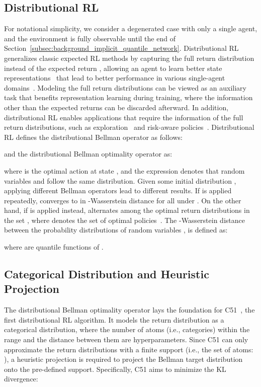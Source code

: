 \documentclass[twoside,11pt]{article}
\begin{document}
\subsection{Distributional RL}
\label{subsec:background_distributional_rl}

For notational simplicity, we consider a degenerated case with only a single agent, and the environment is fully observable until the end of Section~\ref{subsec:background_implicit_quantile_network}. Distributional RL generalizes classic expected RL methods by capturing the full return distribution  instead of the expected return , allowing an agent to learn better state representations~\citep{BDR2022} that lead to better performance in various single-agent domains~\citep{Bellemare2017C51,Bellemare2019S51,Dabney2018QR-DQN,Dabney2018IQN,Rowland2019ER-DQN,Yang2019FQF,Nguyen2021MMDRL}. Modeling the full return distributions can be viewed as an auxiliary task that benefits representation learning during training, where the information other than the expected returns can be discarded afterward. In addition, distributional RL enables applications that require the information of the full return distributions, such as exploration~\citep{Nikolov2019IDS,Zhang2019QUOTA,Mavrin2019DLTV} and risk-aware policies~\citep{Xia2020risk}. Distributional RL defines the distributional Bellman operator  as follows:

and the distributional Bellman optimality operator  as:

where  is the optimal action at state , and the expression  denotes that random variables  and  follow the same distribution. Given some initial distribution , applying different Bellman operators lead to different results.
If  is applied repeatedly,  converges to  in -Wasserstein distance for all  under .
On the other hand, if  is applied instead,  alternates among the optimal return distributions in the set , where  denotes the set of optimal policies~\citep{Bellemare2017C51}. The -Wasserstein distance between the probability distributions of random variables ,  is defined as:

where  are quantile functions of .



\subsection{Categorical Distribution and Heuristic Projection}

The distributional Bellman optimality operator  lays the foundation for C51~\citep{Bellemare2017C51}, the first distributional RL algorithm. It models the return distribution as a categorical distribution, where the number of atoms  (i.e., categories) within the range  and the distance between them  are hyperparameters.
Since C51 can only approximate the return distributions with a finite support (i.e., the set of atoms: ), a heuristic projection is required to project the Bellman target distribution onto the pre-defined support.
Specifically, C51 aims to minimize the KL divergence:
\end{document}
